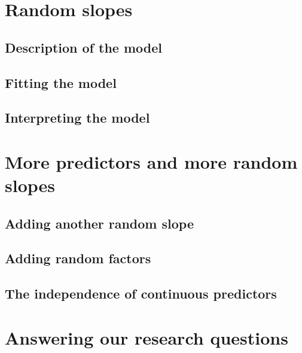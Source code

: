 \documentclass[
]{book}
\begin{document}
\hypertarget{random-slopes-1}{%
\section{Random slopes}\label{random-slopes-1}}

\hypertarget{description-of-the-model-8}{%
\subsection{Description of the model}\label{description-of-the-model-8}}

\hypertarget{fitting-the-model-7}{%
\subsection{Fitting the model}\label{fitting-the-model-7}}

\hypertarget{interpreting-the-model-5}{%
\subsection{Interpreting the model}\label{interpreting-the-model-5}}

\hypertarget{more-predictors-and-more-random-slopes}{%
\section{More predictors and more random slopes}\label{more-predictors-and-more-random-slopes}}

\hypertarget{adding-another-random-slope}{%
\subsection{Adding another random slope}\label{adding-another-random-slope}}

\hypertarget{adding-random-factors}{%
\subsection{Adding random factors}\label{adding-random-factors}}

\hypertarget{the-independence-of-continuous-predictors}{%
\subsection{The independence of continuous predictors}\label{the-independence-of-continuous-predictors}}

\hypertarget{answering-our-research-questions-1}{%
\section{Answering our research questions}\label{answering-our-research-questions-1}}
\end{document}

